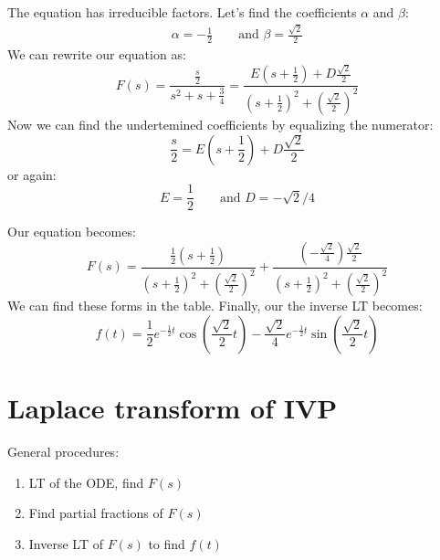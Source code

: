 \begin{itemize}
\begin{exmp}{}
The equation has irreducible factors. Let's find the coefficients $\alpha$ and $\beta$:
\begin{align*}
\alpha=-\frac{1}{2}\qquad \text{and } \beta=\frac{\sqrt{2}}{2}
\end{align*}
We can rewrite our equation as:
\begin{equation*}
F(s)=\frac{\frac{s}{2}}{s^2+s+\frac{3}{4}}=\frac{E(s+\frac{1}{2}) + D\frac{\sqrt{2}}{2}}{(s+\frac{1}{2})^2+(\frac{\sqrt{2}}{2})^2}
\end{equation*}
Now we can find the undertemined coefficients by equalizing the numerator:
\begin{equation*}
\frac{s}{2}=E(s+\frac{1}{2}) + D\frac{\sqrt{2}}{2}
\end{equation*}
or again:
\begin{equation*}
E=\frac{1}{2} \qquad\text{and } D=-\sqrt{2}/4
\end{equation*}
\end{exmp}
Our equation becomes:
\begin{equation*}
F(s)=\frac{\frac{1}{2}(s+\frac{1}{2})}{(s+\frac{1}{2})^2+(\frac{\sqrt{2}}{2})^2}+\frac{ \left(-\frac{\sqrt{2}}{4}\right)\frac{\sqrt{2}}{2}}{(s+\frac{1}{2})^2+(\frac{\sqrt{2}}{2})^2}
\end{equation*}
We can find these forms in the table. Finally, our the inverse LT becomes:
%
\begin{equation*}
f(t)=\frac{1}{2}e^{-\frac{1}{2}t}\cos\left(\frac{\sqrt{2}}{2}t\right)-\frac{\sqrt{2}}{4}e^{-\frac{1}{2}t}\sin\left(\frac{\sqrt{2}}{2}t\right)
\end{equation*}
\end{itemize}

\section{Laplace transform of IVP}
General procedures:
\begin{enumerate}
\item LT of the ODE, find $F(s)$
\item Find partial fractions of $F(s)$
\item Inverse LT of $F(s)$ to find $f(t)$
\end{enumerate}



